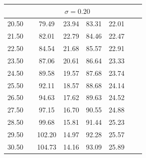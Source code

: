 \documentclass{article}
\begin{document}
\begin{table}[h]
{\begin{tabularx}{\linewidth}{cXcccccr}
		&\multicolumn{5}{c}{$\sigma=0.20$} \\
		\hline 
		     20.50  &&       79.49   &      23.94  &       83.31 &         22.01 \\
         21.50  &&       82.01   &      22.79  &       84.46 &        22.47  \\
         22.50  &&       84.54   &      21.68  &       85.57 &        22.91 \\
         23.50  &&       87.06   &      20.61  &       86.64 &        23.33\\
         24.50  &&       89.58   &      19.57  &       87.68 &        23.74\\
         25.50  &&       92.11   &      18.57  &       88.68 &        24.14\\
         26.50  &&       94.63   &      17.62  &       89.63 &        24.52\\
         27.50  &&       97.15   &      16.70  &       90.55 &        24.88\\
         28.50  &&       99.68   &      15.81  &       91.44 &        25.23\\
         29.50  &&      102.20   &      14.97  &       92.28 &        25.57\\
         30.50  &&      104.73   &      14.16  &       93.09 &        25.89\\

\end{tabularx}}
\end{table}
\end{document}

